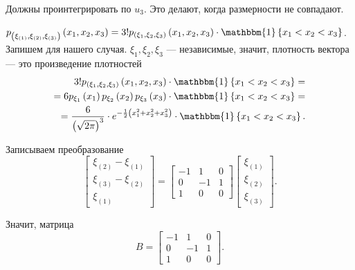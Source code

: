 \begin{enumerate}[label=\alph*)]
  Должны проинтегрировать по $u_3$.
  Это делают, когда размерности не совпадают.

  $p_{ \left( \xi_{ \left( 1 \right) }, \xi_{ \left( 2 \right) }, \xi_{ \left( 3 \right) } \right) }
    \left( x_1, x_2, x_3 \right) =
    3! p_{ \left( \xi_1, \xi_2, \xi_3 \right) } \left( x_1, x_2, x_3 \right) \cdot
    \mathbbm{1} \left\{ x_1 < x_2 < x_3 \right\} $.
  Запишем для нашего случая.
  $ \xi_1, \xi_2, \xi_3$ --- независимые, значит, плотность вектора --- это произведение плотностей
  \begin{equation*}
    \begin{split}
      3! p_{ \left( \xi_1, \xi_2, \xi_3 \right) } \left( x_1, x_2, x_3 \right) \cdot
      \mathbbm{1} \left\{ x_1 < x_2 < x_3 \right\} = \\
      = 6p_{ \xi_1} \left( x_1 \right) p_{ \xi_2} \left( x_2 \right) p_{ \xi_3} \left( x_3 \right) \cdot
      \mathbbm{1} \left\{ x_1 < x_2 < x_3 \right\} = \\
      = \frac{6}{ \left( \sqrt{2 \pi } \right)^3} \cdot
      e^{- \frac{1}{2} \left( x_1^2 + x_2^2 + x_3^2 \right) } \cdot
      \mathbbm{1} \left\{ x_1 < x_2 < x_3 \right\}.
    \end{split}
  \end{equation*}

  Записываем преобразование
  $$ \begin{bmatrix}
      \xi_{ \left( 2 \right) } - \xi_{ \left( 1 \right) } \\
      \xi_{ \left( 3 \right) } - \xi_{ \left( 2 \right) } \\
      \xi_{ \left( 1 \right) }
    \end{bmatrix} =
    \begin{bmatrix}
      -1 & 1 & 0 \\
      0 & -1 & 1 \\
      1 & 0 & 0
    \end{bmatrix}
    \begin{bmatrix}
      \xi_{ \left( 1 \right) } \\
      \xi_{ \left( 2 \right) } \\
      \xi_{ \left( 3 \right) }
    \end{bmatrix}.$$

  Значит, матрица
  $$B =
    \begin{bmatrix}
      -1 & 1 & 0 \\
      0 & -1 & 1 \\
      1 & 0 & 0
    \end{bmatrix}.$$


\end{enumerate}
